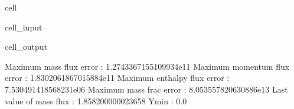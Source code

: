 \documentclass[letterpaper,10pt,english]{jupyterBook}
\begin{document}
\begin{sphinxuseclass}{cell}\begin{sphinxVerbatimInput}

\begin{sphinxuseclass}{cell_input}
\begin{sphinxVerbatim}[commandchars=\\\{\}]
\end{sphinxVerbatim}

\end{sphinxuseclass}\end{sphinxVerbatimInput}
\begin{sphinxVerbatimOutput}

\begin{sphinxuseclass}{cell_output}
\begin{sphinxVerbatim}[commandchars=\\\{\}]
Maximum mass flux error       : 1.2743367155109934e\PYGZhy{}11
Maximum momentum flux error   : 1.8302061867015884e\PYGZhy{}11
Maximum enthalpy flux error   : 7.530491418568231e\PYGZhy{}06
Maximum mass frac error       : 8.053557820630886e\PYGZhy{}13
Last value of mass flux       : 1.858200000023658
Ymin                          : 0.0
\end{sphinxVerbatim}

\noindent{}

\end{sphinxuseclass}\end{sphinxVerbatimOutput}

\end{sphinxuseclass}
\end{document}
